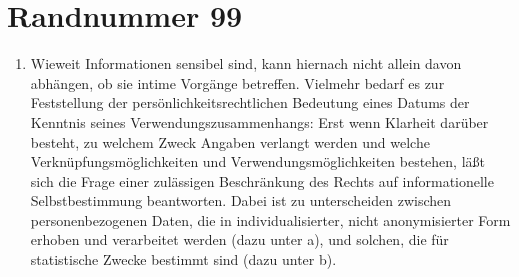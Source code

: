     \section{Randnummer 99}
    \begin{enumerate}[label=\arabic*,start=99]
        \item Wieweit Informationen sensibel sind, kann hiernach nicht allein davon abhängen, ob sie intime Vorgänge betreffen. Vielmehr bedarf es zur Feststellung der per\-sön\-lich\-keits\-recht\-lichen Bedeutung eines Datums der Kenntnis seines Verwendungszusammenhangs: Erst wenn Klarheit darüber besteht, zu welchem Zweck Angaben verlangt werden und welche Verknüpfungsmöglichkeiten und Ver\-wend\-ungs\-mög\-lich\-kei\-ten bestehen, läßt sich die Frage einer zulässigen Beschränkung des Rechts auf informationelle Selbstbestimmung beantworten. Dabei ist zu unterscheiden zwischen personenbezogenen Daten, die in individualisierter, nicht anonymisierter Form erhoben und verarbeitet werden (dazu unter a), und solchen, die für statistische Zwecke bestimmt sind (dazu unter b).
    \end{enumerate}
        
